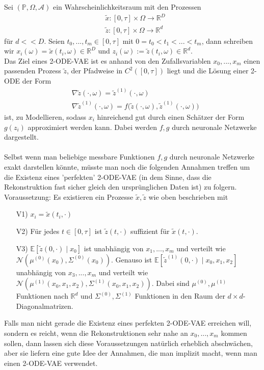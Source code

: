 \documentclass[12pt]{article}
\newcommand{\E}{\mathbb{E}}
\newcommand{\R}{\mathbb{R}}
\newcommand{\tx}{\widetilde{x}}
\newcommand{\tz}{\widetilde{z}}
\newcommand{\bP}{\mathbb{P}}
\begin{document}
	
	
	\newpage
	Sei $(\bP,\Omega,\mathcal{A})$ ein Wahrscheinlichkeitsraum mit den Prozessen
	\begin{align*}
		& \tx : [0,\tau] \times \Omega \rightarrow \R^D\\
		& \tz : [0,\tau] \times \Omega \rightarrow \R^d
	\end{align*}
	für $d << D$. Seien $t_0,...,t_m \in [0,\tau]$ mit $0=t_0<t_1<...<t_m$, dann schreiben wir $x_i(\omega) = \tx(t_i,\omega) \in \R^D$ und $z_i(\omega) := \tz(t_i, \omega) \in \R^d$.\\
	Das Ziel eines 2-ODE-VAE ist es anhand von den Zufallsvariablen $x_0,...,x_m$ einen passenden Prozess $\tz$, der Pfadweise in $C^2([0,\tau])$ liegt und die Lösung einer 2-ODE der Form
	\begin{align*}
		& \nabla \tz(\cdot,\omega) = \tz^{(1)}(\cdot,\omega)\\
		& \nabla \tz^{(1)}(\cdot,\omega) = f\big( \tz(\cdot,\omega), \tz^{(1)}(\cdot,\omega) \big)
	\end{align*}
	ist, zu Modellieren, sodass $x_i$ hinreichend gut durch einen Schätzer der Form $g(z_i)$ approximiert werden kann. Dabei werden $f,g$ durch neuronale Netzwerke dargestellt.\\
	\\
	Selbst wenn man beliebige messbare Funktionen $f,g$ durch neuronale Netzwerke exakt darstellen könnte, müsste man noch die folgenden Annahmen treffen um die Existenz eines 'perfekten' 2-ODE-VAE (in dem Sinne, dass die Rekonstruktion fast sicher gleich den ursprünglichen Daten ist) zu folgern.\\
	Voraussetzung: Es existieren ein Prozesse $\tx,\tz$ wie oben beschrieben mit
	\begin{itemize}
		\item[V1)] $x_i = \tx(t_i,\cdot)$
		
		\item[V2)] Für jedes $t \in [0,\tau]$ ist $\tz(t,\cdot)$ suffizient für $\tx(t,\cdot)$.
		
		\item[V3)] $\E[\tz(0,\cdot) \mid x_0]$ ist unabhängig von $x_1,...,x_m$ und verteilt wie $\mathcal{N}(\mu^{(0)}(x_0),\Sigma^{(0)}(x_0))$. Genauso ist $\E[\tz^{(1)}(0,\cdot) \mid x_0,x_1,x_2]$ unabhängig von $x_3,...,x_m$ und verteilt wie $\mathcal{N}(\mu^{(1)}(x_0,x_1,x_2),\Sigma^{(1)}(x_0,x_1,x_2))$. Dabei sind $\mu^{(0)},\mu^{(1)}$ Funktionen nach $\R^d$ und $\Sigma^{(0)},\Sigma^{(1)}$ Funktionen in den Raum der $d \times d$-Diagonalmatrizen.
	\end{itemize}
	Falls man nicht gerade die Existenz eines perfekten 2-ODE-VAE erreichen will, sondern es reicht, wenn die Rekonstruktionen sehr nahe an $x_0,...,x_m$ kommen sollen, dann lassen sich diese Voraussetzungen natürlich erheblich abschwächen, aber sie liefern eine gute Idee der Annahmen, die man implizit macht, wenn man einen 2-ODE-VAE verwendet.
	
\end{document}
